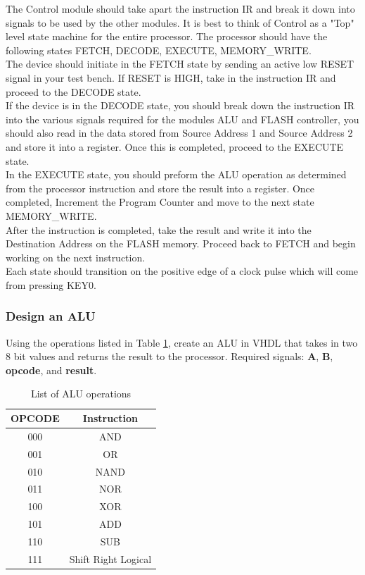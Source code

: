 The Control module should take apart the instruction IR and break it down into signals to be used by the other modules. It is best to think of Control as a "Top" level state machine for the entire processor. The processor should have the following states FETCH, DECODE, EXECUTE, MEMORY\_WRITE. \\ 

The device should initiate in the FETCH state by sending an active low RESET signal in your test bench. If RESET is HIGH, take in the instruction IR and proceed to the DECODE state. \\

If the device is in the DECODE state, you should break down the instruction IR into the various signals required for the modules ALU and FLASH controller, you should also read in the data stored from Source Address 1 and Source Address 2 and store it into a register. Once this is completed,  proceed to the EXECUTE state. \\

In the EXECUTE state, you should preform the ALU operation as determined from the processor instruction and store the result into a register. Once completed, Increment the Program Counter and move to the next state MEMORY\_WRITE. \\

After the instruction is completed, take the result and write it into the Destination Address on the FLASH memory. Proceed back to FETCH and begin working on the next instruction. \\

Each state should transition on the positive edge of a clock pulse which will come from pressing KEY0.

\subsubsection{Design an ALU}
Using the operations listed in Table \ref{tab:aluop}, create an ALU in VHDL that takes in two 8 bit values and returns the result to the processor. Required signals: {\bf A}, {\bf B}, {\bf opcode}, and {\bf result}.

\begin {table}[H]
	\caption {List of ALU operations} 
	\label{tab:aluop} 
	\begin{center}
    		\begin{tabular}{ | c | c |}
			\hline
 			{\bf OPCODE} & {\bf Instruction} \\ \hline
			000 & AND \\ \hline
			001 & OR \\ \hline
			010 & NAND \\ \hline
			011 & NOR \\ \hline
			100 & XOR \\ \hline
			101 & ADD \\ \hline
			110 & SUB \\ \hline
			111 & Shift Right Logical \\
			\hline
    		\end{tabular}
	\end{center}
\end{table}

